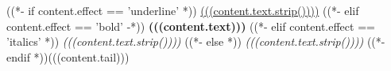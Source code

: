 ((*- if content.effect == 'underline' *))
 \underline{(((content.text.strip())))}
((*- elif content.effect == 'bold' -*))
\textbf{(((content.text)))}
((*- elif content.effect == 'italics' *))
 \textit{(((content.text.strip())))}
((*- else *))
 \emph{(((content.text.strip())))} 
((*- endif *))(((content.tail)))
